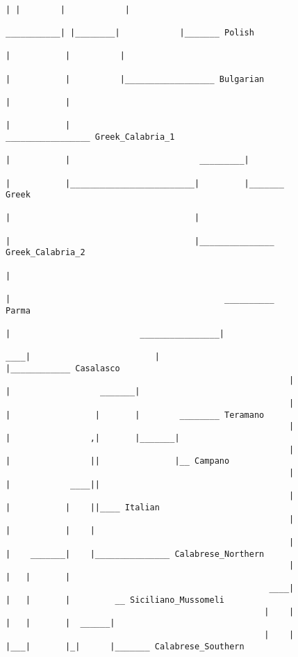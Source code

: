 \begin{figure}[H]
\begin{center}
{\begin{verbatim}
                                                                          | |        |            |
                                                               ___________| |________|            |_______ Polish
                                                              |           |          |
                                                              |           |          |__________________ Bulgarian
                                                              |           |
                                                              |           |                                    _________________ Greek_Calabria_1
                                                              |           |                          _________|
                                                              |           |_________________________|         |_______ Greek
                                                              |                                     |
                                                              |                                     |_______________ Greek_Calabria_2
                                                              |
                                                              |                                           __________ Parma
                                                              |                          ________________|
                                                          ____|                         |                |____________ Casalasco
                                                         |    |                  _______|
                                                         |    |                 |       |        ________ Teramano
                                                         |    |                ,|       |_______|
                                                         |    |                ||               |__ Campano
                                                         |    |            ____||
                                                         |    |           |    ||____ Italian
                                                         |    |           |    |
                                                         |    |    _______|    |_______________ Calabrese_Northern
                                                         |    |   |       |
                                                     ____|    |   |       |         __ Siciliano_Mussomeli
                                                    |    |    |   |       |  ______|
                                                    |    |    |___|       |_|      |_______ Calabrese_Southern

\end{verbatim}}
\end{center}
\end{figure}
